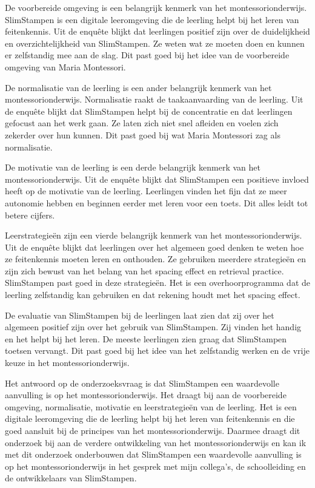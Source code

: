 \documentclass[12pt, a4paper]{article}
\begin{document}
De voorbereide omgeving is een belangrijk kenmerk van het montessorionderwijs. SlimStampen is een digitale leeromgeving die de leerling helpt bij het leren van feitenkennis. Uit de enquête blijkt dat leerlingen positief zijn over de duidelijkheid en overzichtelijkheid van SlimStampen. Ze weten wat ze moeten doen en kunnen er zelfstandig mee aan de slag. Dit past goed bij het idee van de voorbereide omgeving van Maria Montessori.

De normalisatie van de leerling is een ander belangrijk kenmerk van het montessorionderwijs. Normalisatie raakt de taakaanvaarding van de leerling. Uit de enquête blijkt dat SlimStampen helpt bij de concentratie en dat leerlingen gefocust aan het werk gaan. Ze laten zich niet snel afleiden en voelen zich zekerder over hun kunnen. Dit past goed bij wat Maria Montessori zag als normalisatie.

De motivatie van de leerling is een derde belangrijk kenmerk van het montessorionderwijs. Uit de enquête blijkt dat SlimStampen een positieve invloed heeft op de motivatie van de leerling. Leerlingen vinden het fijn dat ze meer autonomie hebben en beginnen eerder met leren voor een toets. Dit alles leidt tot betere cijfers.

Leerstrategieën zijn een vierde belangrijk kenmerk van het montessorionderwijs. Uit de enquête blijkt dat leerlingen over het algemeen goed denken te weten hoe ze feitenkennis moeten leren en onthouden. Ze gebruiken meerdere strategieën en zijn zich bewust van het belang van het spacing effect en retrieval practice. SlimStampen past goed in deze strategieën. Het is een overhoorprogramma dat de leerling zelfstandig kan gebruiken en dat rekening houdt met het spacing effect.

De evaluatie van SlimStampen bij de leerlingen laat zien dat zij over het algemeen positief zijn over het gebruik van SlimStampen. Zij vinden het handig en het helpt bij het leren. De meeste leerlingen zien graag dat SlimStampen toetsen vervangt. Dit past goed bij het idee van het zelfstandig werken en de vrije keuze in het montessorionderwijs.

Het antwoord op de onderzoeksvraag is dat SlimStampen een waardevolle aanvulling is op het montessorionderwijs. Het draagt bij aan de voorbereide omgeving, normalisatie, motivatie en leerstrategieën van de leerling. Het is een digitale leeromgeving die de leerling helpt bij het leren van feitenkennis en die goed aansluit bij de principes van het montessorionderwijs. Daarmee draagt dit onderzoek bij aan de verdere ontwikkeling van het montessorionderwijs en kan ik met dit onderzoek onderbouwen dat SlimStampen een waardevolle aanvulling is op het montessorionderwijs in het gesprek met mijn collega's, de schoolleiding en de ontwikkelaars van SlimStampen.
\end{document}
